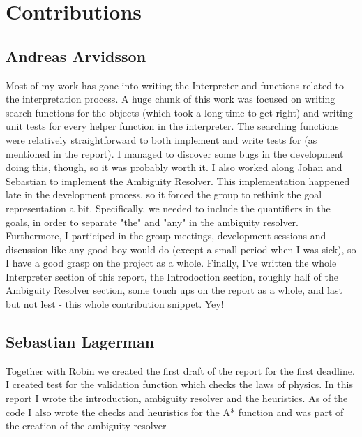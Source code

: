 \section*{Contributions}
\subsection*{Andreas Arvidsson}
Most of my work has gone into writing the Interpreter and functions related to the interpretation process.
A huge chunk of this work was focused on writing search functions for the objects (which took a long time to get right) and writing unit tests for every helper function in the interpreter.
The searching functions were relatively straightforward to both implement and write tests for (as mentioned in the report).
I managed to discover some bugs in the development doing this, though, so it was probably worth it.
\newline
\newline
I also worked along Johan and Sebastian to implement the Ambiguity Resolver. This implementation happened late in the development process, so it forced the group to rethink the goal representation a bit. Specifically, we needed to include the quantifiers in the goals, in order to separate "the" and "any" in the ambiguity resolver.
\newline
\newline
Furthermore, I participed in the group meetings, development sessions and discussion like any good boy would do (except a small period when I was sick), so I have a good grasp on the project as a whole.
\newline
\newline
Finally, I've written the whole Interpreter section of this report, the Introdoction section, roughly half of the Ambiguity Resolver section, some touch ups on the report as a whole, and last but not lest - this whole contribution snippet. Yey!

\subsection*{Sebastian Lagerman}
Together with Robin we created the first draft of the report for the first deadline.
\newline
\newline
I created test for the validation function which checks the laws of physics.
\newline
\newline
In this report I wrote the introduction, ambiguity resolver and the heuristics.
\newline
\newline
As of the code I also wrote the checks and heuristics for the A* function and was part of the creation of the ambiguity resolver

